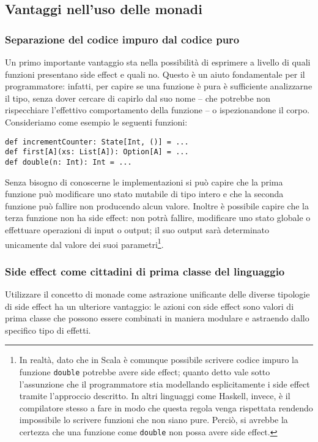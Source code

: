 \subsection{Vantaggi nell'uso delle monadi}
\subsubsection{Separazione del codice impuro dal codice puro}
Un primo importante vantaggio sta nella possibilità di esprimere a livello di  quali funzioni presentano side effect e quali no. Questo è un aiuto fondamentale per il programmatore: infatti, per capire se una funzione è pura è sufficiente analizzarne il tipo, senza dover cercare di capirlo dal suo nome -- che potrebbe non rispecchiare l'effettivo comportamento della funzione -- o ispezionandone il corpo.
Consideriamo come esempio le seguenti funzioni:
\begin{lstlisting}[language=scala3]
def incrementCounter: State[Int, ()] = ...
def first[A](xs: List[A]): Option[A] = ...
def double(n: Int): Int = ...
\end{lstlisting}
Senza bisogno di conoscerne le implementazioni si può capire che la prima funzione può modificare uno stato mutabile di tipo intero e che la seconda funzione può fallire non producendo alcun valore. Inoltre è possibile capire che la terza funzione non ha side effect: non potrà fallire, modificare uno stato globale o effettuare operazioni di input o output; il suo output sarà determinato unicamente dal valore dei suoi parametri\footnote{In realtà, dato che in Scala è comunque possibile scrivere codice impuro la funzione \lstinline{double} potrebbe avere side effect; quanto detto vale sotto l'assunzione che il programmatore stia modellando esplicitamente i side effect tramite l'approccio descritto. In altri linguaggi come Haskell, invece, è il compilatore stesso a fare in modo che questa regola venga rispettata rendendo impossibile lo scrivere funzioni che non siano pure. Perciò, si avrebbe la certezza che una funzione come \lstinline{double} non possa avere side effect.}.

\subsubsection{Side effect come cittadini di prima classe del linguaggio}
Utilizzare il concetto di monade come astrazione unificante delle diverse tipologie di side effect ha un ulteriore vantaggio: le azioni con side effect sono valori di prima classe che possono essere combinati in maniera modulare e astraendo dallo specifico tipo di effetti.

